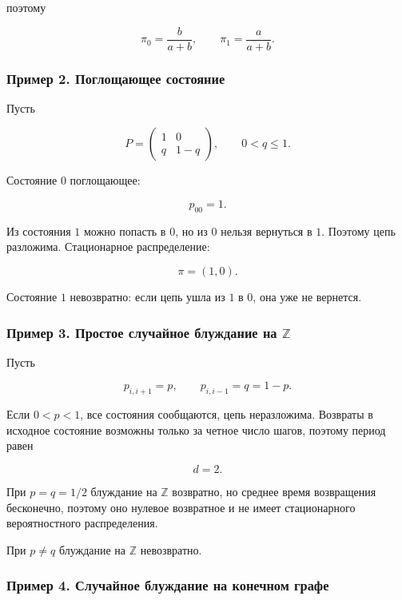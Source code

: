 \documentclass[
  11pt,
  a4paper,
]{article}
\begin{document}
поэтому

\[
\pi_0=\frac{b}{a+b},
\qquad
\pi_1=\frac{a}{a+b}.
\]

\subsubsection{Пример 2. Поглощающее
состояние}\label{ux43fux440ux438ux43cux435ux440-2.-ux43fux43eux433ux43bux43eux449ux430ux44eux449ux435ux435-ux441ux43eux441ux442ux43eux44fux43dux438ux435}

Пусть

\[
P=
\begin{pmatrix}
1 & 0\\
q & 1-q
\end{pmatrix},
\qquad
0<q\le1.
\]

Состояние \(0\) поглощающее:

\[
p_{00}=1.
\]

Из состояния \(1\) можно попасть в \(0\), но из \(0\) нельзя вернуться в
\(1\). Поэтому цепь разложима. Стационарное распределение:

\[
\pi=(1,0).
\]

Состояние \(1\) невозвратно: если цепь ушла из \(1\) в \(0\), она уже не
вернется.

\subsubsection{\texorpdfstring{Пример 3. Простое случайное блуждание на
\(\mathbb Z\)}{Пример 3. Простое случайное блуждание на \textbackslash mathbb Z}}\label{ux43fux440ux438ux43cux435ux440-3.-ux43fux440ux43eux441ux442ux43eux435-ux441ux43bux443ux447ux430ux439ux43dux43eux435-ux431ux43bux443ux436ux434ux430ux43dux438ux435-ux43dux430-mathbb-z}

Пусть

\[
p_{i,i+1}=p,
\qquad
p_{i,i-1}=q=1-p.
\]

Если \(0<p<1\), все состояния сообщаются, цепь неразложима. Возвраты в
исходное состояние возможны только за четное число шагов, поэтому период
равен

\[
d=2.
\]

При \(p=q=1/2\) блуждание на \(\mathbb Z\) возвратно, но среднее время
возвращения бесконечно, поэтому оно нулевое возвратное и не имеет
стационарного вероятностного распределения.

При \(p\ne q\) блуждание на \(\mathbb Z\) невозвратно.

\subsubsection{Пример 4. Случайное блуждание на конечном
графе}\label{ux43fux440ux438ux43cux435ux440-4.-ux441ux43bux443ux447ux430ux439ux43dux43eux435-ux431ux43bux443ux436ux434ux430ux43dux438ux435-ux43dux430-ux43aux43eux43dux435ux447ux43dux43eux43c-ux433ux440ux430ux444ux435}
\end{document}
